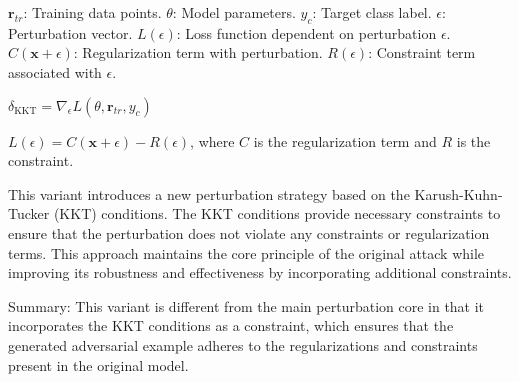 $\mathbf{r}_{tr}$: Training data points.  
$\theta$: Model parameters.  
$y_c$: Target class label.  
$\epsilon$: Perturbation vector.  
$L(\epsilon)$: Loss function dependent on perturbation $\epsilon$.  
$C(\mathbf{x} + \epsilon)$: Regularization term with perturbation.  
$R(\epsilon)$: Constraint term associated with $\epsilon$.


$\delta_{\text{KKT}} = \nabla_\epsilon L(\theta, \mathbf{r}_{tr}, y_c)$

$L(\epsilon) = C(\mathbf{x} + \epsilon) - R(\epsilon)$, where $C$ is the regularization term and $R$ is the constraint.

This variant introduces a new perturbation strategy based on the Karush-Kuhn-Tucker (KKT) conditions. The KKT conditions provide necessary constraints to ensure that the perturbation does not violate any constraints or regularization terms. This approach maintains the core principle of the original attack while improving its robustness and effectiveness by incorporating additional constraints.

Summary: This variant is different from the main perturbation core in that it incorporates the KKT conditions as a constraint, which ensures that the generated adversarial example adheres to the regularizations and constraints present in the original model.